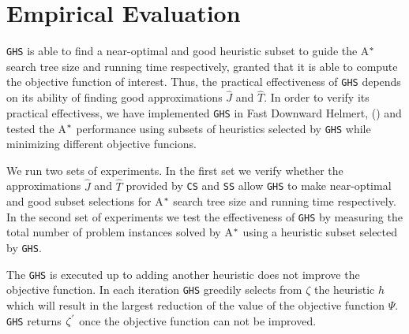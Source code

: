 



\chapter{Empirical Evaluation}\label{ch:empirical_evaluation}
\noindent
\texttt{GHS} is able to find a near-optimal and good heuristic subset to guide the A$\sp{*}$ search tree size and running time respectively, granted that it is able to compute the objective function of interest. Thus, the practical effectiveness of \texttt{GHS} depends on its ability of finding good approximations $\hat{J}$ and $\hat{T}$. In order to verify its practical effectivess, we have implemented \texttt{GHS} in Fast Downward Helmert, (\citeyear{helmert2006fast}) and tested the A$\sp{*}$ performance using subsets of heuristics selected by \texttt{GHS} while minimizing different objective funcions.

We run two sets of experiments. In the first set we verify whether the approximations $\hat{J}$ and $\hat{T}$ provided by \texttt{CS} and \texttt{SS} allow \texttt{GHS} to make near-optimal and good subset selections for A$\sp{*}$ search tree size and running time respectively. In the second set of experiments we test the effectiveness of \texttt{GHS} by measuring the total number of problem instances solved by A$\sp{*}$ using a heuristic subset selected by \texttt{GHS}.

The \texttt{GHS} is executed up to adding another heuristic does not improve the objective function. In each iteration \texttt{GHS} greedily selects from $\zeta$ the heuristic $h$ which will result in the largest reduction of the value of the objective function $\Psi$. \texttt{GHS} returns $\zeta\sp{'}$ once the objective function can not be improved.

